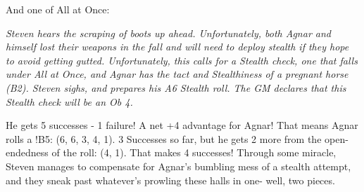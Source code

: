 \documentclass[../main.tex]{subfiles}
\begin{document}
        And one of All at Once:
        \vspace*{0.1cm}
        \begin{mdframed}[style=Arrata]
            {\em Steven hears the scraping of boots up ahead. Unfortunately, both Agnar and himself lost their weapons in the fall and will need to deploy stealth if they hope to avoid getting gutted. Unfortunately, this calls for a Stealth check, one that falls under All at Once, and Agnar has the tact and Stealthiness of a pregnant horse (B2). Steven sighs, and prepares his A6 Stealth roll. The GM declares that this Stealth check will be an Ob 4.
        
            He gets 5 successes - 1 failure! A net +4 advantage for Agnar! That means Agnar rolls a !B5: (6, 6, 3, 4, 1). 3 Successes so far, but he gets 2 more from the open-endedness of the roll: (4, 1). That makes 4 successes! Through some miracle, Steven manages to compensate for Agnar's bumbling mess of a stealth attempt, and they sneak past whatever's prowling these halls in one- well, two pieces.}
        \end{mdframed}
\end{document}
